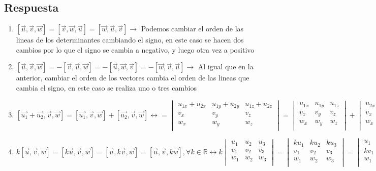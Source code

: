 \documentclass[
	12pt, %
	spanish, %
]{fphw}
\newcommand{\vu}{\vec{u}}
\newcommand{\vv}{\vec{v}}
\newcommand{\vw}{\vec{w}}
\begin{document}
\subsection*{Respuesta}
\begin{enumerate}
	\item $[\vu,\vv,\vw] = [\vv,\vw,\vu] = [\vw,\vu,\vv] \rightarrow$ Podemos cambiar el orden de las lineas de los determinantes cambiando el signo, en este caso se hacen dos cambios por lo que el signo se cambia a negativo, y luego otra vez a positivo
	\item $[\vu,\vv,\vw] = - [\vv,\vu,\vw] = - [\vu,\vw,\vv] = - [\vw,\vv,\vu] \rightarrow$ Al igual que en la anterior, cambiar el orden de los vectores cambia el orden de las lineas que cambia el signo, en este caso se realiza uno o tres cambios
	\item $[\vec{u_1} + \vec{u_2}, \vv,\vw] = [\vec{u_1},\vv,\vw] + [\vec{u_2},\vv,\vw] \leftrightarrow =
	\begin{vmatrix}
			u_{1x} + u_{2x} & u_{1y} + u_{2y} & u_{1z}+ u_{2z}\\
			v_x & v_y & v_z\\
			w_x & w_y & w_z\\	
	\end{vmatrix}
	=
	\begin{vmatrix}
			u_{1x} & u_{1y} & u_{1z}\\
			v_x & v_y & v_z\\
			w_x & w_y & w_z\\	
	\end{vmatrix}
	+
	\begin{vmatrix}
			u_{2x} & u_{2y} & u_{2z}\\
			v_x & v_y & v_z\\
			w_x & w_y & w_z\\	
	\end{vmatrix}$
	\item $k[\vu,\vv,\vw] = [k\vu,\vv,\vw] = [\vu,k\vv,\vw] = [\vu,\vv,k\vw], \forall k \in \mathbb{R} \leftrightarrow k 
	\begin{vmatrix}
	u_1 & u_2 & u_3\\
	v_1 & v_2 & v_3\\
	w_1 & w_2 & w_3\\	
	\end{vmatrix}
	= 
	\begin{vmatrix}
		ku_1 & ku_2 & ku_3\\
		v_1 & v_2 & v_3\\
		w_1 & w_2 & w_3\\	
	\end{vmatrix}
	=
	\begin{vmatrix}
			u_1 & u_2 & u_3\\
			kv_1 & kv_2 & kv_3\\
			w_1 & w_2 & w_3\\	
	\end{vmatrix}
	=
	\begin{vmatrix}
			u_1 & u_2 & u_3\\
			v_1 & v_2 & v_3\\
			kw_1 & kw_2 & kw_3\\	
	\end{vmatrix}$

\end{enumerate}
\end{document}
